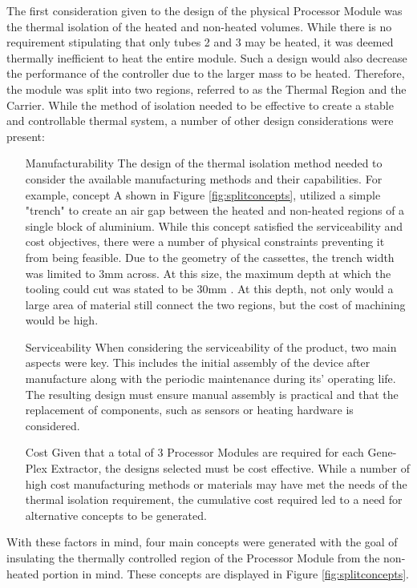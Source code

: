 The first consideration given to the design of the physical Processor Module was the thermal isolation of the heated and non-heated volumes. While there is no requirement stipulating that only tubes 2 and 3 may be heated, it was deemed  thermally inefficient to heat the entire module. Such a design would also decrease the performance of the controller due to the larger mass to be heated. Therefore, the module was split into two regions, referred to as the Thermal Region and the Carrier. While the method of isolation needed to be effective to create a stable and controllable thermal system, a number of other design considerations were present:
\begin{enumerate}
	\item[Manufacturability] The design of the thermal isolation method needed to consider the available manufacturing methods and their capabilities. For example, concept A shown in Figure \ref{fig:splitconcepts}, utilized a simple "trench" to create an air gap between the heated and non-heated regions of a single block of aluminium. While this concept satisfied the serviceability and cost objectives, there were a number of physical constraints preventing it from being feasible. Due to the geometry of the cassettes, the trench width was limited to 3mm across. At this size, the maximum depth at which the tooling could cut was stated to be 30mm \cite{Sorenson}. At this depth, not only would a large area of material still connect the two regions, but the cost of machining would be high.
	\item[Serviceability] When considering the serviceability of the product, two main aspects were key. This includes the initial assembly of the device after manufacture along with the periodic maintenance during its' operating life. The resulting design must ensure manual assembly is practical and that the replacement of components, such as sensors or heating hardware is considered. 
	\item[Cost] Given that a total of 3 Processor Modules are required for each Gene-Plex Extractor, the designs selected must be cost effective. While a number of high cost manufacturing methods or materials may have met the needs of the thermal isolation requirement, the cumulative cost required led to a need for alternative concepts to be generated.
\end{enumerate}	

With these factors in mind, four main concepts were generated with the goal of insulating the thermally controlled region of the Processor Module from the non-heated portion in mind. These concepts are displayed in Figure \ref{fig:splitconcepts}.\\

